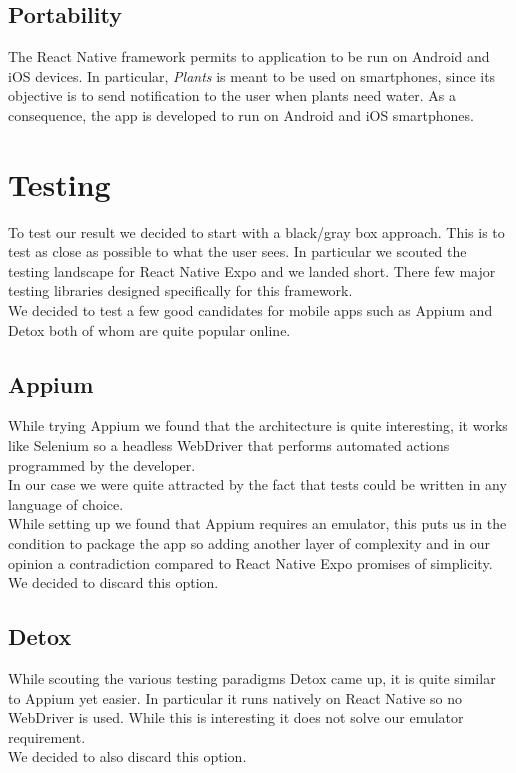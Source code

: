 \documentclass[10pt]{article}
\begin{document}
	\subsection{Portability}
	The React Native framework permits to application to be run on Android and iOS devices. In particular, \textit{Plants} is meant to be used on smartphones, since its objective is to send notification to the user when plants need water. As a consequence, the app is developed to run on Android and iOS smartphones.
	\newpage
    
    \section{Testing}
    To test our result we decided to start with a black/gray box approach. This is to test as close as possible to what the user sees. In particular we scouted the testing landscape for React Native Expo and we landed short. There few major testing libraries designed specifically for this framework. \\
    We decided to test a few good candidates for mobile apps such as Appium and Detox both of whom are quite popular online.
    \subsection{Appium}
    While trying Appium we found that the architecture is quite interesting, it works like Selenium so a headless WebDriver that performs automated actions programmed by the developer. \\
    In our case we were quite attracted by the fact that tests could be written in any language of choice. \\
    While setting up we found that Appium requires an emulator, this puts us in the condition to package the app so adding another layer of complexity and in our opinion a contradiction compared to React Native Expo promises of simplicity. \\
    We decided to discard this option.
    \subsection{Detox}
    While scouting the various testing paradigms Detox came up, it is quite similar to Appium yet easier. In particular it runs natively on React Native so no WebDriver is used. While this is interesting it does not solve our emulator requirement. \\
    We decided to also discard this option.
\end{document}
